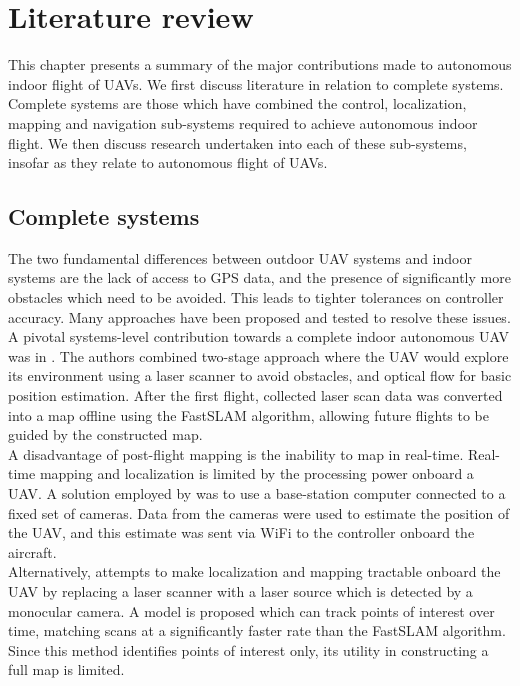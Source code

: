 \documentclass[capstone_report.tex]{subfiles}
\begin{document}
\chapter{Literature review}
This chapter presents a summary of the major contributions made to autonomous indoor flight of UAVs. We first discuss literature in relation to complete systems. Complete systems are those which have combined the control, localization, mapping and navigation sub-systems required to achieve autonomous indoor flight. We then discuss research undertaken into each of these sub-systems, insofar as they relate to autonomous flight of UAVs.\\

\section{Complete systems}
The two fundamental differences between outdoor UAV systems and indoor systems are the lack of access to GPS data, and the presence of significantly more obstacles which need to be avoided. This leads to tighter tolerances on controller accuracy. Many approaches have been proposed and tested to resolve these issues.\\

A pivotal systems-level contribution towards a complete indoor autonomous UAV was in \cite{feicui}. The authors combined two-stage approach where the UAV would explore its environment using a laser scanner to avoid obstacles, and optical flow for basic position estimation. After the first flight, collected laser scan data was converted into a map offline using the FastSLAM algorithm, allowing future flights to be guided by the constructed map. \\

A disadvantage of post-flight mapping is the inability to map in real-time. Real-time mapping and localization is limited by the processing power onboard a UAV. A solution employed by \cite{yu:ccdc:2017} was to use a base-station computer connected to a fixed set of cameras. Data from the cameras were used to estimate the position of the UAV, and this estimate was sent via WiFi to the controller onboard the aircraft. \\

Alternatively, \cite{qzeng} attempts to make localization and mapping tractable onboard the UAV by replacing a laser scanner with a laser source which is detected by a monocular camera. A model is proposed which can track points of interest over time, matching scans at a significantly faster rate than the FastSLAM algorithm. Since this method identifies points of interest only, its utility in constructing a full map is limited.\\
\end{document}

